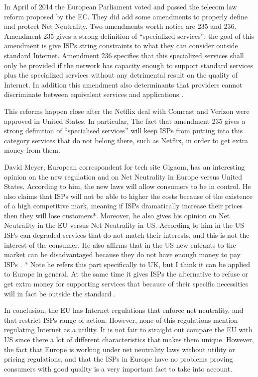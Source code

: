 \documentclass{sigcomm-alternate}
\begin{document}
In April of 2014 the European Parliament voted and passed the telecom law reform proposed by the EC. They did add some amendments to properly define and protect Net Neutrality. Two amendments worth notice are 235 and 236. Amendment 235 gives a strong definition of “specialized services”; the goal of this amendment is give ISPs string constraints to what they can consider outside standard Internet. Amendment 236 specifies that this specialized services shall only be provided if the network has capacity enough to support standard services plus the specialized services without any detrimental result on the quality of Internet. In addition this amendment also determinants that providers cannot discriminate between equivalent services and applications \cite{gigaom}.

This reforms happen close after the Netflix deal with Comcast and Verizon were approved in United States. In particular, The fact that amendment 235 gives a strong definition of “specialised services” will keep ISPs from putting into this category services that do not belong there, such as Netflix, in order to get extra money from them.

David Meyer, European correspondent for tech site Gigaom, has an interesting opinion on the new regulation and on Net Neutrality in Europe versus United States. According to him, the new laws will allow consumers to be in control. He also claims that ISPs will not be able to higher the costs because of the existence of a high competitive mark, meaning if ISPs dramatically increase their prices then they will lose customers*. Moreover, he also gives his opinion on Net Neutrality in the EU versus Net Neutrality in US. According to him in the US ISPs can degraded services that do not match their interests, and this is not the interest of the consumer. He also affirms that in the US new entrants to the market can be disadvantaged because they do not have enough money to pay ISPs \cite{inthenews}.
* Note he refers this part specifically to UK, but I think it can be applied to Europe in general.  At the same time it gives ISPs the alternative to refuse or get extra money for supporting services that because of their specific necessities will in fact be outside the standard . 


In conclusion, the EU has Internet regulations that enforce net neutrality, and that restrict ISPs range of action. However, none of this regulations mention regulating Internet as a utility. It is not fair to straight out compare the EU with US since there a lot of different characteristics that makes them unique. However, the fact that Europe is working under net neutrality laws without utility or pricing regulations, and that the ISPs in Europe have no problems proving consumers with good quality  is a very important fact to take into account.
\end{document}
